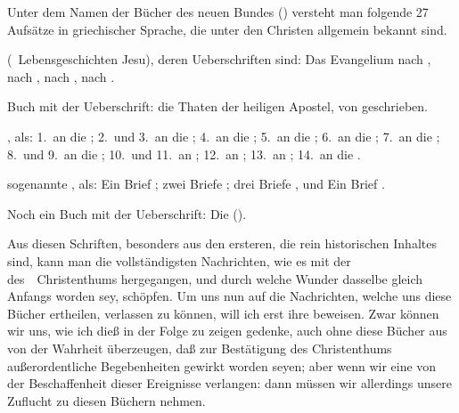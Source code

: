 \begin{aufza}
\item Unter dem Namen der Bücher des neuen Bundes () versteht man folgende 27 Aufsätze in griechischer Sprache, die unter den Christen allgemein bekannt sind.
\begin{aufzb}
\item {} (\dh\ Lebensgeschichten Jesu), deren Ueberschriften sind: Das Evangelium nach , nach , nach , nach .
\item {} Buch mit der Ueberschrift: die Thaten der heiligen Apostel, von  geschrieben.
\item {}, als: 1.~an die ; 2.~und 3.~an die ; 4.~an die ; 5.~an die ; 6.~an die ; 7.~an die ; 8.~und 9.~an die ; 10.~und 11.~an ; 12.~an ; 13.~an ; 14.~an die .
\item {} sogenannte , als: Ein Brief ; zwei Briefe ; drei Briefe , und Ein Brief .
\item Noch ein Buch mit der Ueberschrift: Die  ().
\end{aufzb}
\item Aus diesen Schriften, besonders aus den  ersteren, die rein historischen Inhaltes sind, kann man die vollständigsten Nachrichten, wie es mit der  des~\ Christenthums hergegangen, und durch welche Wunder dasselbe gleich Anfangs  worden sey, schöpfen. Um uns nun auf die Nachrichten, welche uns diese Bücher ertheilen, verlassen zu können, will ich erst ihre  beweisen. Zwar können wir uns, wie ich dieß in der Folge zu zeigen gedenke, auch ohne diese Bücher aus  von der Wahrheit überzeugen, daß zur Bestätigung des Christenthums außerordentliche Begebenheiten gewirkt worden seyen; aber wenn wir eine  von der Beschaffenheit dieser Ereignisse verlangen: dann müssen wir allerdings unsere Zuflucht zu diesen Büchern nehmen.

\end{aufza}
